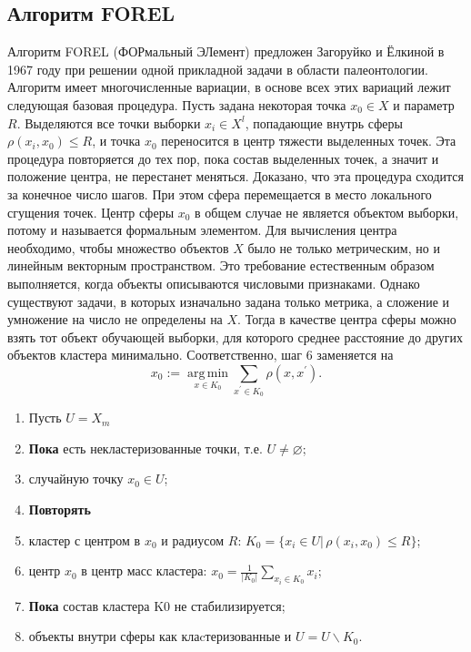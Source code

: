 \documentclass[article, 10pt]{disser}
\DeclareMathOperator*{\argmin}{arg\,min}
\begin{document}
\subsection{Алгоритм FOREL}
Алгоритм FOREL (ФОРмальный ЭЛемент) предложен Загоруйко и Ёлкиной в 1967 году при решении одной прикладной задачи в области палеонтологии. Алгоритм
имеет многочисленные вариации, в основе всех этих вариаций лежит следующая базовая процедура. Пусть задана некоторая точка $x_0 \in X$ и параметр $R$. Выделяются все точки выборки $x_i \in X^{l}$, попадающие внутрь сферы $\rho(x_i, x_0) \leq R$, и точка $x_0$ переносится в центр тяжести выделенных точек. Эта процедура повторяется до тех пор, пока состав выделенных точек, а значит и положение центра, не перестанет меняться. Доказано, что эта процедура сходится за конечное число шагов. При этом сфера перемещается в место локального сгущения точек. Центр сферы $x_0$ в общем случае не является объектом выборки, потому и называется формальным элементом. Для вычисления центра необходимо, чтобы множество объектов $X$ было не только метрическим, но и линейным векторным пространством. Это требование естественным образом выполняется, когда объекты описываются числовыми признаками. Однако существуют задачи, в которых изначально задана только метрика, а сложение и умножение на число не определены на $X$. Тогда в качестве центра сферы можно взять тот объект обучающей выборки, для которого среднее расстояние до других объектов кластера минимально. Соответственно, шаг 6 заменяется на
\begin{equation*}
    x_0 := \argmin\limits_{x \in K_0}\sum\limits_{x^{'}\in K_0}\rho(x, x^{'}).
\end{equation*}
\begin{enumerate}
       \item Пусть $U = X_m$
       \item \textbf{Пока} есть некластеризованные точки, т.е. $U \neq \varnothing$;
       \item {} случайную точку $x_0 \in U$;
       \item \quad\textbf{Повторять}
       \item \quad{} кластер с центром в $x_0$ и радиусом $R$: $K_0 = \{x_i \in U |\, \rho(x_i, x_0) \leq R\}$;
       \item \quad{} центр $x_0$ в центр масс кластера: $x_0 = \frac{1}{|K_0|}\sum\limits_{x_i \in K_0}x_i$;
       \item \quad\textbf{Пока} состав кластера K0 не стабилизируется;
       \item {} объекты внутри сферы как клаcтеризованные и  $U = U \backslash K_0$.
   \end{enumerate}
\end{document}
